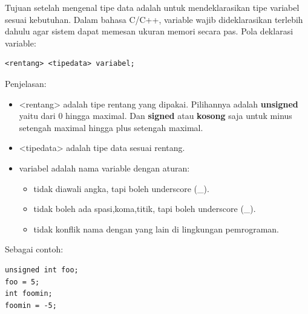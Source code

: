\documentclass[12pt,]{article}
\begin{document}
	Tujuan setelah mengenal tipe data adalah untuk mendeklarasikan tipe variabel sesuai kebutuhan.
	Dalam bahasa C/C++, variable wajib dideklarasikan terlebih dahulu agar sistem dapat memesan ukuran memori secara pas.
	Pola deklarasi variable:
	\begin{verbatim}
<rentang> <tipedata> variabel;
	\end{verbatim}
	Penjelasan:
	\begin{itemize}
		\item <rentang> adalah tipe rentang yang dipakai.
		Pilihannya adalah \textbf{unsigned} yaitu dari 0 hingga maximal.
		Dan \textbf{signed} atau \textbf{kosong} saja untuk minus setengah maximal hingga plus setengah maximal.
		\item <tipedata> adalah tipe data sesuai rentang.
		\item variabel adalah nama variable dengan aturan:
		\begin{itemize}
			\item tidak diawali angka, tapi boleh underscore (\_).
			\item tidak boleh ada spasi,koma,titik, tapi boleh underscore (\_).
			\item tidak konflik nama dengan yang lain di lingkungan pemrograman.
		\end{itemize}
	\end{itemize}

	Sebagai contoh:
	\begin{verbatim}
unsigned int foo;
foo = 5;
int foomin;
foomin = -5;
	\end{verbatim}
	
	
	
\end{document}

